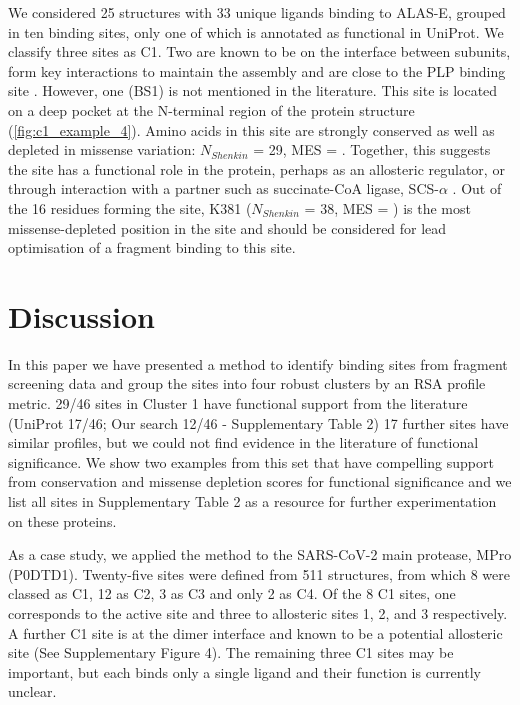 We considered 25 structures with 33 unique ligands binding to ALAS-E, grouped in ten binding sites, only one of which is annotated as functional in UniProt. We classify three sites as C1. Two are known to be on the interface between subunits, form key interactions to maintain the assembly and are close to the PLP binding site \cite{BAILEY_2020_AMINOLEVULINATE}. However, one (BS1) is not mentioned in the literature. This site is located on a deep pocket at the N-terminal region of the protein structure (\autoref{fig:c1_example_4}). Amino acids in this site are strongly conserved as well as depleted in missense variation: $N_{Shenkin}$ = 29, MES = . Together, this suggests the site has a functional role in the protein, perhaps as an allosteric regulator, or through interaction with a partner such as succinate-CoA ligase, SCS-$\alpha$ \cite{FURUYAMA_2000_SIDEROBLASTIC}. Out of the 16 residues forming the site, K381 ($N_{Shenkin}$ = 38, MES = ) is the most missense-depleted position in the site and should be considered for lead optimisation of a fragment binding to this site.

\section{Discussion}

In this paper we have presented a method to identify binding sites from fragment screening data and group the sites into four robust clusters by an RSA profile metric. 29/46 sites in Cluster 1 have functional support from the literature (UniProt 17/46; Our search 12/46 - Supplementary Table 2) 17 further sites have similar profiles, but we could not find evidence in the literature of functional significance. We show two examples from this set that have compelling support from conservation and missense depletion scores for functional significance and we list all sites in Supplementary Table 2 as a resource for further experimentation on these proteins.

As a case study, we applied the method to the SARS-CoV-2 main protease, MPro (P0DTD1). Twenty-five sites were defined from 511 structures, from which 8 were classed as C1, 12 as C2, 3 as C3 and only 2 as C4. Of the 8 C1 sites, one corresponds to the active site and three to allosteric sites 1, 2, and 3 \cite{DASGUPTA_2022_ALLOSTERIC} respectively. A further C1 site  is at the dimer interface and known to be a potential allosteric site \cite{DOUANGAMATH_2020_SARSCOV2} (See Supplementary Figure 4). The remaining three C1 sites may be important, but each binds only a single ligand and their function is currently unclear.

